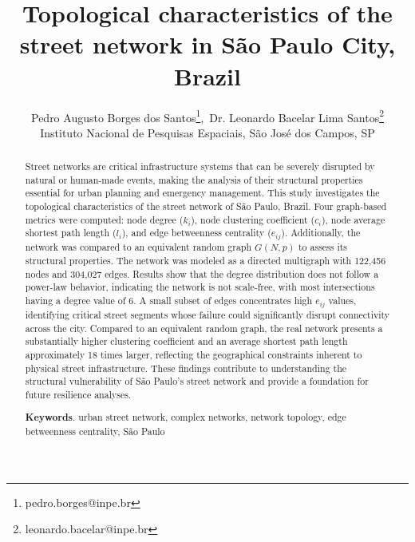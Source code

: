 \documentclass{pssbmac}
\begin{document}

\title{Topological characteristics of the street network in São Paulo City, Brazil}

\author{
    {\large Pedro Augusto Borges dos Santos}\thanks{pedro.borges@inpe.br},\  {\large Dr. Leonardo Bacelar Lima Santos}\thanks{leonardo.bacelar@inpe.br}\\
    {\small Instituto Nacional de Pesquisas Espaciais, São José dos Campos, SP}
}
\criartitulo



\begin{abstract}

Street networks are critical infrastructure systems that can be severely disrupted by natural or human-made events, making the analysis of their structural properties essential for urban planning and emergency management. This study investigates the topological characteristics of the street network of São Paulo, Brazil. Four graph-based metrics were computed: node degree ($k_i$), node clustering coefficient ($c_i$), node average shortest path length ($l_i$), and edge betweenness centrality ($e_{ij}$). Additionally, the network was compared to an equivalent random graph $G(N, p)$ to assess its structural properties. The network was modeled as a directed multigraph with 122,456 nodes and 304,027 edges. Results show that the degree distribution does not follow a power-law behavior, indicating the network is not scale-free, with most intersections having a degree value of 6. A small subset of edges concentrates high $e_{ij}$ values, identifying critical street segments whose failure could significantly disrupt connectivity across the city. Compared to an equivalent random graph, the real network presents a substantially higher clustering coefficient and an average shortest path length approximately 18 times larger, reflecting the geographical constraints inherent to physical street infrastructure. These findings contribute to understanding the structural vulnerability of São Paulo's street network and provide a foundation for future resilience analyses.

\noindent
{\bf Keywords}. urban street network, complex networks, network topology, edge betweenness centrality, São Paulo
\end{abstract}
\end{document}
